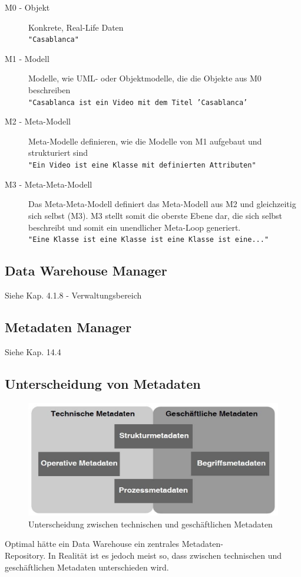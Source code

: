 \documentclass[a4paper, 11pt, nofootinbib]{article}
\newcommand{\code}[1]{\texttt{#1}}
\begin{document}
\begin{description}
	\item[M0 - Objekt] Konkrete, Real-Life Daten\\
		\code{"Casablanca"}
	\item[M1 - Modell] Modelle, wie UML- oder Objektmodelle, die die Objekte aus M0 beschreiben \\
		\code{"Casablanca ist ein Video mit dem Titel 'Casablanca'}
	\item[M2 - Meta-Modell] Meta-Modelle definieren, wie die Modelle von M1 aufgebaut und strukturiert sind \\
		\code{"Ein Video ist eine Klasse mit definierten Attributen"}
	\item[M3 - Meta-Meta-Modell] Das Meta-Meta-Modell definiert das Meta-Modell aus M2 und gleichzeitig sich selbst (M3). M3 stellt somit die oberste Ebene dar, die sich selbst beschreibt und somit ein unendlicher Meta-Loop generiert.\\
		\code{"Eine Klasse ist eine Klasse ist eine Klasse ist eine..."}
\end{description}

\subsection{Data Warehouse Manager}
Siehe Kap. 4.1.8 - Verwaltungsbereich

\subsection{Metadaten Manager}
Siehe Kap. 14.4

\subsection{Unterscheidung von Metadaten}
\begin{figure}
	\centering
	\includegraphics[keepaspectratio=true,height=10\baselineskip]{metadaten.png}
	\caption{Unterscheidung zwischen technischen und geschäftlichen Metadaten}
	\label{fig:metadaten}
\end{figure}
Optimal hätte ein Data Warehouse ein zentrales Metadaten-\\ Repository. In Realität ist es jedoch meist so, dass zwischen technischen und geschäftlichen Metadaten unterschieden wird.
\end{document}
